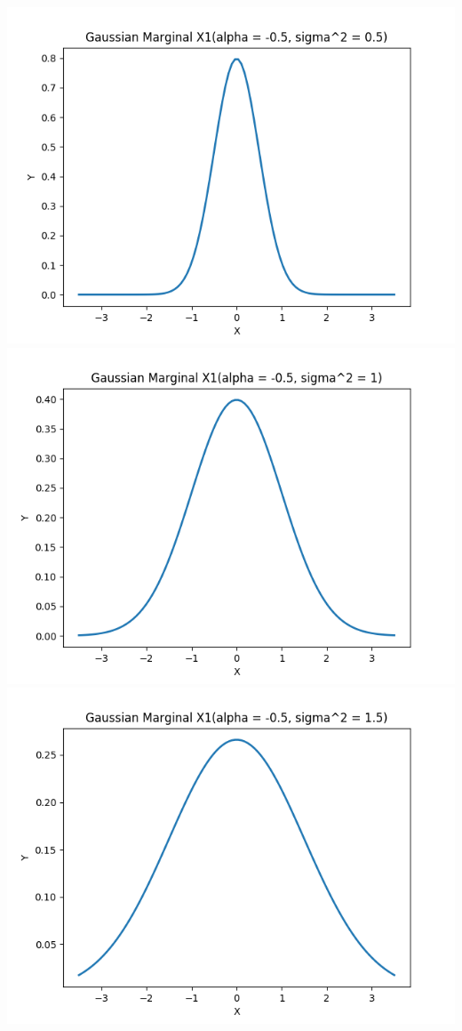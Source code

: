\documentclass{article}
\begin{document}
\includegraphics[width=\linewidth]{X1(alpha = -0.5, sigma^2 = 0.5).png}
\includegraphics[width=\linewidth]{X1(alpha = -0.5, sigma^2 = 1).png}
\includegraphics[width=\linewidth]{X1(alpha = -0.5, sigma^2 = 1.5).png}
\end{document}
